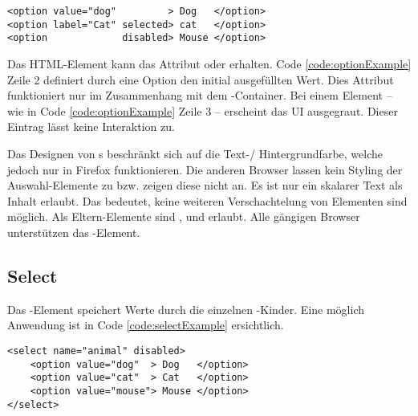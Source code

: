 \begin{lstlisting}[style = htmlcssjs, caption = Option Beispiel, label = code:optionExample]
<option value="dog"         > Dog   </option>
<option label="Cat" selected> cat   </option>
<option             disabled> Mouse </option>
\end{lstlisting}    

Das HTML-Element kann das Attribut  oder  erhalten. 
Code \ref{code:optionExample} Zeile 2 definiert durch eine  Option den initial ausgefüllten Wert. 
Dies Attribut funktioniert nur im Zusammenhang mit dem -Container. 
Bei einem  Element – wie in Code \ref{code:optionExample} Zeile 3 – erscheint das UI ausgegraut. 
Dieser Eintrag lässt keine Interaktion zu. 

Das Designen von s beschränkt sich auf die Text-/ Hintergrundfarbe, welche jedoch nur in Firefox funktionieren. 
Die anderen Browser lassen kein Styling der Auswahl-Elemente zu bzw. zeigen diese nicht an. 
Es ist nur ein skalarer Text als Inhalt erlaubt. 
Das bedeutet, keine weiteren Verschachtelung von Elementen sind möglich. 
Als Eltern-Elemente sind ,  und  erlaubt. 
Alle gängigen Browser unterstützen das -Element. 


\subsection{Select}
\label{sec:select}

Das -Element speichert Werte durch die einzelnen -Kinder. 
Eine möglich Anwendung ist in Code \ref{code:selectExample} ersichtlich. 

\begin{lstlisting}[style = htmlcssjs, caption = Disabled Select Beispiel, label = code:selectExample]
<select name="animal" disabled>
    <option value="dog"  > Dog   </option>
    <option value="cat"  > Cat   </option>
    <option value="mouse"> Mouse </option>
</select>
\end{lstlisting}

